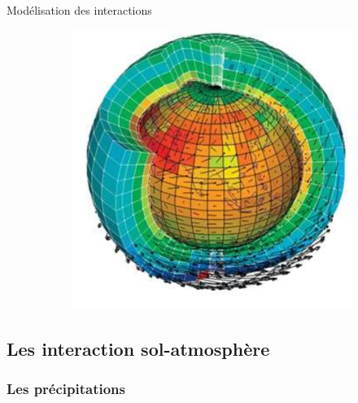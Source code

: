\documentclass{beamer}
\numberwithin{equation}{section}
\begin{document}
\begin{frame}
\begin{block}{Modélisation des interactions}
\begin{figure}
\begin{center}
\begin{subfigure}[b]{0.45\textwidth}
			\end{subfigure}
			\hfill
			\begin{subfigure}[b]{0.45\textwidth}
				\includegraphics[scale=0.13]{images/maillage_terre.png}
			\end{subfigure}
		\end{center}
		\end{figure}
	\end{block}
	\end{frame}

	\subsection{Les interaction sol-atmosphère}
	
	\subsubsection{Les précipitations}
	
\end{document}
